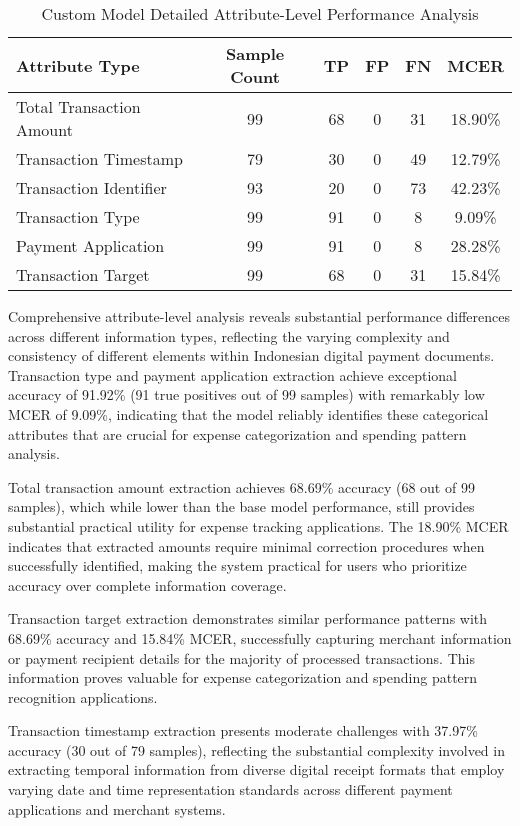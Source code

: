 \begin{table}[htbp]
\centering
\caption{Custom Model Detailed Attribute-Level Performance Analysis}
\label{tab:custom-model-detail}
\begin{tabular}{|l|c|c|c|c|c|}
\hline
\textbf{Attribute Type} & \textbf{Sample Count} & \textbf{TP} & \textbf{FP} & \textbf{FN} & \textbf{MCER} \\
\hline
Total Transaction Amount & 99 & 68 & 0 & 31 & 18.90\% \\
Transaction Timestamp & 79 & 30 & 0 & 49 & 12.79\% \\
Transaction Identifier & 93 & 20 & 0 & 73 & 42.23\% \\
Transaction Type & 99 & 91 & 0 & 8 & 9.09\% \\
Payment Application & 99 & 91 & 0 & 8 & 28.28\% \\
Transaction Target & 99 & 68 & 0 & 31 & 15.84\% \\
\hline
\end{tabular}
\end{table}

Comprehensive attribute-level analysis reveals substantial performance differences across different information types, reflecting the varying complexity and consistency of different elements within Indonesian digital payment documents. Transaction type and payment application extraction achieve exceptional accuracy of 91.92\% (91 true positives out of 99 samples) with remarkably low MCER of 9.09\%, indicating that the model reliably identifies these categorical attributes that are crucial for expense categorization and spending pattern analysis.

Total transaction amount extraction achieves 68.69\% accuracy (68 out of 99 samples), which while lower than the base model performance, still provides substantial practical utility for expense tracking applications. The 18.90\% MCER indicates that extracted amounts require minimal correction procedures when successfully identified, making the system practical for users who prioritize accuracy over complete information coverage.

Transaction target extraction demonstrates similar performance patterns with 68.69\% accuracy and 15.84\% MCER, successfully capturing merchant information or payment recipient details for the majority of processed transactions. This information proves valuable for expense categorization and spending pattern recognition applications.

Transaction timestamp extraction presents moderate challenges with 37.97\% accuracy (30 out of 79 samples), reflecting the substantial complexity involved in extracting temporal information from diverse digital receipt formats that employ varying date and time representation standards across different payment applications and merchant systems.

